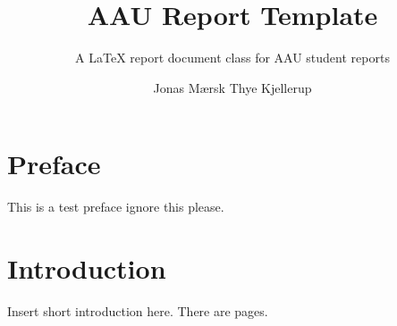 \documentclass[11pt]{aau-report}
\title{AAU Report Template}
\subtitle{A \LaTeX{} report document class for AAU student reports}
\author{Jonas Mærsk Thye Kjellerup}
\begin{document}
\frontmatter
\def\bothFrontpages{1}
\cleardoublepage

\tableofcontents
\chapter{Preface}
This is a test preface ignore this please.

\mainmatter
\chapter{Introduction}
Insert short introduction here. There are \pageref{LastPage} pages.
\end{document}
